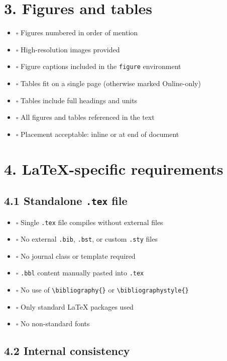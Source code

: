 \documentclass[11pt]{article}
\newcommand{\cbox}{$\square$ }
\begin{document}
\section*{3. Figures and tables}

\begin{itemize}[leftmargin=1.2cm]
    \item \cbox Figures numbered in order of mention
    \item \cbox High-resolution images provided
    \item \cbox Figure captions included in the \texttt{figure} environment
    \item \cbox Tables fit on a single page (otherwise marked Online-only)
    \item \cbox Tables include full headings and units
    \item \cbox All figures and tables referenced in the text
    \item \cbox Placement acceptable: inline or at end of document
\end{itemize}

\section*{4. LaTeX-specific requirements}

\subsection*{4.1 Standalone \texttt{.tex} file}

\begin{itemize}[leftmargin=1.2cm]
    \item \cbox Single \texttt{.tex} file compiles without external files
    \item \cbox No external \texttt{.bib}, \texttt{.bst}, or custom \texttt{.sty} files
    \item \cbox No journal class or template required
    \item \cbox \texttt{.bbl} content manually pasted into \texttt{.tex}
    \item \cbox No use of \texttt{\textbackslash bibliography\{\}} or \texttt{\textbackslash bibliographystyle\{\}}
    \item \cbox Only standard LaTeX packages used
    \item \cbox No non-standard fonts
\end{itemize}

\subsection*{4.2 Internal consistency}
\end{document}
